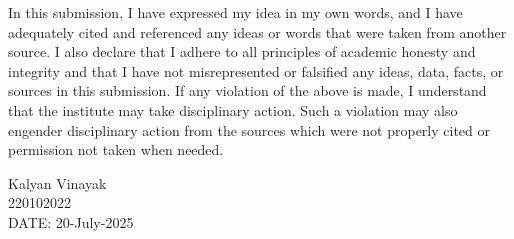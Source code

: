 \documentclass[a4paper, 11pt, oneside]{report}
\begin{document}
In this submission, I have expressed my idea in my own words, and I have adequately cited and referenced any ideas or words that were taken from another source. I also declare that I adhere to all principles of academic honesty and integrity and that I have not misrepresented or falsified any ideas, data, facts, or sources in this submission. If any violation of the above is made, I understand that the institute may take disciplinary action. Such a violation may also engender disciplinary action from the sources which were not properly cited or permission not taken when needed.

\vspace{1cm}
\hspace{7cm} Kalyan Vinayak \\
\vspace{1cm}
\hspace{9cm} 220102022 \\
\vspace{1cm}
DATE: 20-July-2025

\newpage
\end{document}
